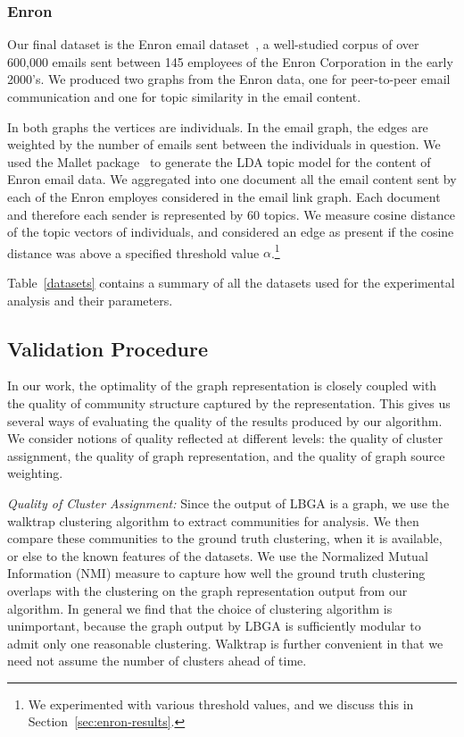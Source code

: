 \documentclass{article}
\begin{document}
\subsubsection{Enron}
Our final dataset is the Enron email dataset~\cite{EnronConf, Enron}, a
well-studied corpus of over 600,000 emails sent between 145 employees of the
Enron Corporation in the early 2000's. We produced two graphs from the Enron
data, one for peer-to-peer email communication and one for topic similarity in
the email content. 

In both graphs the vertices are individuals. In the email graph, the edges are
weighted by the number of emails sent between the individuals in question. We
used the Mallet package~\cite{mallet} to generate the LDA topic model for the
content of Enron email data. We aggregated into one document all the email
content sent by each of the Enron employes considered in the email link graph.
Each document and therefore each sender is represented by 60 topics. We measure
cosine distance of the topic vectors of individuals, and considered an edge as
present if the cosine distance was above a specified threshold value
$\alpha$.\footnote{We experimented with various threshold values, and we
discuss this in Section~\ref{sec:enron-results}.}

Table~\ref{datasets} contains a summary of all the datasets used for
the experimental analysis and their parameters. 


\subsection{Validation Procedure} 
\label{sec:validation}
In our work, the optimality of the graph representation is closely coupled with
the quality of community structure captured by the representation. This gives
us several ways of evaluating the quality of the results produced by our
algorithm. We consider notions of quality reflected at different levels: the
quality of cluster assignment, the quality of graph representation, and the
quality of graph source weighting. 

{\em Quality of Cluster Assignment:} Since the output of LBGA is a graph, we
use the walktrap clustering algorithm to extract communities for analysis. We
then compare these communities to the ground truth clustering, when it is
available, or else to the known features of the datasets.  We use the
Normalized Mutual Information (NMI) measure \cite{Danon05} to capture how well
the ground truth clustering overlaps with the clustering on the graph
representation output from our algorithm. In general we find that the choice of
clustering algorithm is unimportant, because the graph output by LBGA is
sufficiently modular to admit only one reasonable clustering. Walktrap is
further convenient in that we need not assume the number of clusters ahead of
time.
\end{document}
